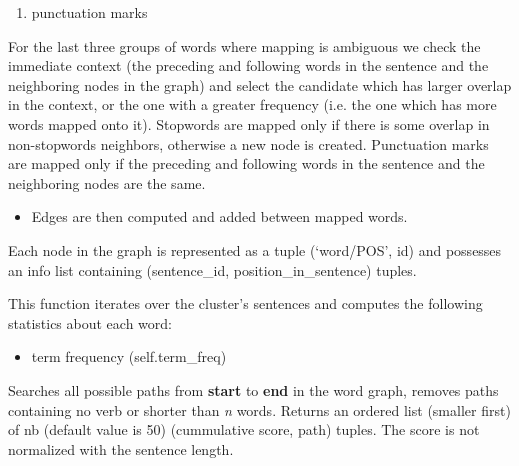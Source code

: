 \documentclass[letterpaper,10pt,english]{sphinxmanual}
\begin{document}
\begin{fulllineitems}
\begin{fulllineitems}
\begin{itemize}
\begin{enumerate}
\item {} 
punctuation marks

\end{enumerate}

\end{itemize}

For the last three groups of words where mapping is ambiguous we check 
the immediate context (the preceding and following words in the sentence 
and the neighboring nodes in the graph) and select the candidate which 
has larger overlap in the context, or the one with a greater frequency 
(i.e. the one which has more words mapped onto it). Stopwords are mapped 
only if there is some overlap in non-stopwords neighbors, otherwise a 
new node is created. Punctuation marks are mapped only if the preceding 
and following words in the sentence and the neighboring nodes are the
same.
\begin{itemize}
\item {} 
Edges are then computed and added between mapped words.

\end{itemize}

Each node in the graph is represented as a tuple (`word/POS', id) and 
possesses an info list containing (sentence\_id, position\_in\_sentence)
tuples.

\end{fulllineitems}


\begin{fulllineitems}
\label{index:takahe.word_graph.compute_statistics}
This function iterates over the cluster's sentences and computes the
following statistics about each word:
\begin{itemize}
\item {} 
term frequency (self.term\_freq)

\end{itemize}

\end{fulllineitems}


\begin{fulllineitems}
\label{index:takahe.word_graph.get_compression}
Searches all possible paths from \textbf{start} to \textbf{end} in the word graph,
removes paths containing no verb or shorter than \emph{n} words. Returns an
ordered list (smaller first) of nb (default value is 50) (cummulative 
score, path) tuples. The score is not normalized with the sentence 
length.


\end{fulllineitems}
\end{fulllineitems}
\end{document}
